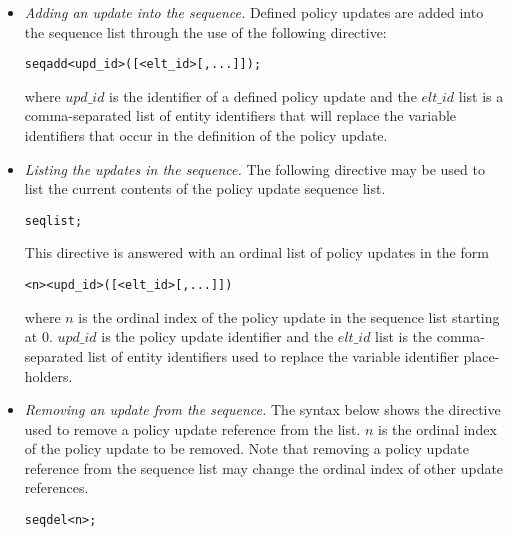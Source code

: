 \documentclass[glov2,twocolumn,final]{svjour2}
\newenvironment{vverbatim}
  {\begin{alltt}}
  {\vspace{-\baselineskip}\end{alltt}}
\begin{document}
        \begin{itemize}
          \item
            {\em Adding an update into the sequence.}
            Defined policy updates are added into the sequence list through the
            use of the following directive:

            \begin{vverbatim}
  seq add <upd\_id>([<elt\_id>[, ...]]);
            \end{vverbatim}

            \noindent where $upd\_id$ is the identifier of a defined policy
            update and the $elt\_id$ list is a comma-separated list of entity
            identifiers that will replace the variable identifiers that occur
            in the definition of the policy update.

          \item
            {\em Listing the updates in the sequence.}
            The following directive may be used to list the current contents of
            the policy update sequence list.

            \begin{vverbatim}
  seq list;
            \end{vverbatim}

            This directive is answered with an ordinal list of policy updates
            in the form

            \begin{vverbatim}
  <n> <upd\_id>([<elt\_id>[, ...]])
            \end{vverbatim}

            \noindent where $n$ is the ordinal index of the policy update
            in the sequence list starting at 0. $upd\_id$ is the policy
            update identifier and the $elt\_id$ list is the comma-separated
            list of entity identifiers used to replace the variable identifier
            place-holders.

          \item
            {\em Removing an update from the sequence.}
            The syntax below shows the directive used to remove a policy update
            reference from the list. $n$ is the ordinal index of the policy
            update to be removed. Note that removing a policy update reference
            from the sequence list may change the ordinal index of other update
            references.

            \begin{vverbatim}
  seq del <n>;
            \end{vverbatim}


\end{itemize}
\end{document}
